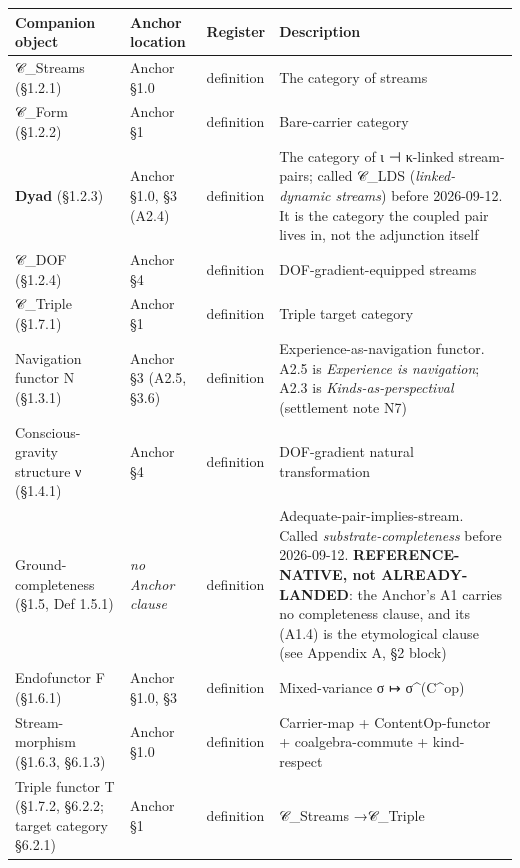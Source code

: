 \documentclass[11pt, openany]{book}
\begin{document}
\begingroup\setlength{\tabcolsep}{3pt}\renewcommand{\arraystretch}{1.15}\footnotesize
\begin{longtable}{p{0.63in} p{0.51in} p{0.51in} p{2.63in}}
\toprule
Companion object & Anchor location & Register & Description \\
\midrule
\endhead
\bottomrule
\endfoot
𝒞\_\allowbreak{}Streams (§1.2.1) & Anchor §1.0 & definition & The category of streams \\
\midrule
𝒞\_\allowbreak{}Form (§1.2.2) & Anchor §1 & definition & Bare-carrier category \\
\midrule
\textbf{Dyad} (§1.2.3) & Anchor §1.0, §3 (A2.4) & definition & The category of ι ⊣ κ-linked stream-pairs; called 𝒞\_\allowbreak{}LDS (\textit{linked-dynamic streams}) before 2026-09-12. It is the category the coupled pair lives in, not the adjunction itself \\
\midrule
𝒞\_\allowbreak{}DOF (§1.2.4) & Anchor §4 & definition & DOF-gradient-equipped streams \\
\midrule
𝒞\_\allowbreak{}Triple (§1.7.1) & Anchor §1 & definition & Triple target category \\
\midrule
Navigation functor N (§1.3.1) & Anchor §3 (A2.5, §3.6) & definition & Experience-as-navigation functor. A2.5 is \textit{Experience is navigation}; A2.3 is \textit{Kinds-as-perspectival} (settlement note N7) \\
\midrule
Conscious-gravity structure ν (§1.4.1) & Anchor §4 & definition & DOF-gradient natural transformation \\
\midrule
Ground-completeness (§1.5, Def 1.5.1) & \textit{no Anchor clause} & definition & Adequate-pair-implies-stream. Called \textit{substrate-completeness} before 2026-09-12. \textbf{REFERENCE-NATIVE, not ALREADY-LANDED}: the Anchor's A1 carries no completeness clause, and its (A1.4) is the etymological clause (see Appendix A, §2 block) \\
\midrule
Endofunctor F (§1.6.1) & Anchor §1.0, §3 & definition & Mixed-variance σ ↦ σ\textasciicircum{}(C\textasciicircum{}op) \\
\midrule
Stream-morphism (§1.6.3, §6.1.3) & Anchor §1.0 & definition & Carrier-map + ContentOp-functor + coalgebra-commute + kind-respect \\
\midrule
Triple functor T (§1.7.2, §6.2.2; target category §6.2.1) & Anchor §1 & definition & 𝒞\_\allowbreak{}Streams →\allowbreak  𝒞\_\allowbreak{}Triple \\
\bottomrule
\end{longtable}
\endgroup
\end{document}
